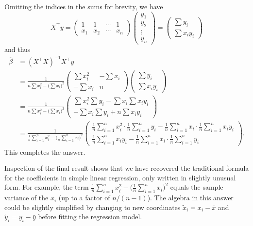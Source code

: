 \documentclass[
  a4paper,
]{article}
\theoremstyle{definition}
\theoremstyle{definition}
\theoremstyle{definition}
\theoremstyle{definition}
\theoremstyle{remark}
\begin{document}
\begin{myanswers}
Omitting the indices in the sums for brevity, we have
\begin{equation*}
    X^\top y
    = \begin{pmatrix}
        1 & 1 & \cdots & 1 \\
        x_1 & x_2 & \cdots & x_n
    \end{pmatrix} \begin{pmatrix}
      y_1 \\ y_2 \\ \vdots \\ y_n
    \end{pmatrix}
    = \begin{pmatrix}
      \sum y_i \\
      \sum x_i y_i
    \end{pmatrix}
  \end{equation*}
and thus
\begin{align*}
    \hat\beta
    &= (X^\top X)^{-1} X^\top y \\
    &= \frac{1}{n \sum x_i^2 - \bigl(\sum x_i\bigr)^2}
      \begin{pmatrix}
      \sum x_i^2 & -\sum x_i \\
      -\sum x_i & n
    \end{pmatrix}
    \begin{pmatrix}
      \sum y_i \\
      \sum x_i y_i
    \end{pmatrix} \\
    &= \frac{1}{n \sum x_i^2 - \bigl(\sum x_i\bigr)^2}
      \begin{pmatrix}
        \sum x_i^2 \sum y_i - \sum x_i \sum x_i y_i \\
        -\sum x_i \sum y_i + n \sum x_i y_i
      \end{pmatrix} \\
    &= \frac{1}{\frac1n \sum_{i=1}^n x_i^2 - \bigl(\frac1n \sum_{i=1}^n x_i\bigr)^2}
      \begin{pmatrix}
        \frac1n \sum_{i=1}^n x_i^2 \cdot \frac1n\sum_{i=1}^n y_i
            - \frac1n\sum_{i=1}^n x_i \cdot \frac1n\sum_{i=1}^n x_i y_i \\
        \frac1n\sum_{i=1}^n x_i y_i
            - \frac1n\sum_{i=1}^n x_i \cdot \frac1n\sum_{i=1}^n y_i
      \end{pmatrix}.
  \end{align*}
This completes the answer.

Inspection of the final result shows that we have recovered the traditional
formula for the coefficients in simple linear regression, only written in
slightly unusual form. For example, the term \(\frac1n \sum_{i=1}^n x_i^2 -
  \bigl(\frac1n \sum_{i=1}^n x_i\bigr)^2\) equals the sample variance of the
\(x_i\) (up to a factor of \(n/(n-1)\)). The algebra in this answer could be
slightly simplified by changing to new coordinates \(\tilde x_i = x_i - \bar
  x\) and \(\tilde y_i = y_i - \bar y\) before fitting the regression model.

\end{myanswers}
\end{document}
